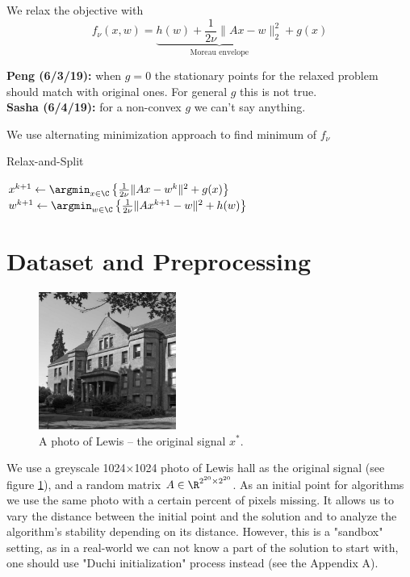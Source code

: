 \documentclass[11pt,letterpaper]{article}
\newcommand{\Peng}[1]{\textbf{Peng (#1):}}
\newcommand{\Sasha}[1]{\textbf{Sasha (#1):}}
\numberwithin{equation}{section} %
\numberwithin{figure}{section} %
\numberwithin{table}{section} %
\begin{document}
    We relax the objective with 
    \[
        f_{\nu}(x, w) = \underbrace{h(w) + \frac{1}{2\nu}\|Ax - w\|_2^2}_{\text{Moreau envelope}} + g(x)
    \]
    
    \begin{tip} \Peng{6/3/19} when $g = 0$ the stationary points for the relaxed problem should match with original ones. For general $g$ this is not true. \\
        \Sasha{6/4/19} for a non-convex $g$ we can't say anything. 
    \end{tip}

    
    We use alternating minimization approach to find minimum of $f_{\nu}$
    
    \begin{algorithm}
        \caption{Relax-and-Split \cite{Zheng2018RelaxAndSplit}}
        \label{alg:relax-and-split}
        \begin{algorithmic}[1]
            \State $x^{k+1} \gets \argmin_{x \in \C} \left\{\frac{1}{2\nu}\|Ax - w^k\|^2 + g(x)\right\}$
            \State $w^{k+1} \gets \argmin_{w \in \C} \left\{\frac{1}{2\nu}\|Ax^{k+1} - w\|^2 + h(w)\right\} $
        \end{algorithmic}
    \end{algorithm}

\section{Dataset and Preprocessing} %
\label{sec:dataset_and_preprocessing}
\begin{figure}
    \centering
    \includegraphics[width=0.4\textwidth]{images/lewis_grayscale_1024}
    \caption{\label{fig:lewis} A photo of Lewis -- the original signal $x^*$.}
\end{figure}
We use a greyscale 1024$\times$1024 photo of Lewis hall as the original signal (see figure \ref{fig:lewis}), and a random matrix $A \in \R^{2^{20}\times 2^{20}}$. As an initial point for algorithms we use the same photo with a certain percent of pixels missing. It allows us to vary the distance between the initial point and the solution and to analyze the algorithm's stability depending on its distance. However, this is a "sandbox" setting, as in a real-world we can not know a part of the solution to start with, one should use "Duchi initialization" process instead (see the Appendix A).
\end{document}
